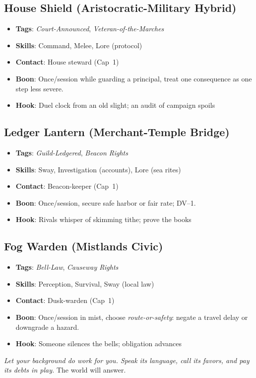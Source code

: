 \subsection*{House Shield (Aristocratic-Military Hybrid)}
\begin{itemize}
\item \textbf{Tags}: \textit{Court-Announced}, \textit{Veteran-of-the-Marches}
\item \textbf{Skills}: Command, Melee, Lore (protocol)
\item \textbf{Contact}: House steward (Cap~1)
\item \textbf{Boon}: Once/session while guarding a principal, treat one consequence as one step less severe.
\item \textbf{Hook}: Duel clock from an old slight; an audit of campaign spoils
\end{itemize}

\subsection*{Ledger Lantern (Merchant-Temple Bridge)}
\begin{itemize}
\item \textbf{Tags}: \textit{Guild-Ledgered}, \textit{Beacon Rights}
\item \textbf{Skills}: Sway, Investigation (accounts), Lore (sea rites)
\item \textbf{Contact}: Beacon-keeper (Cap~1)
\item \textbf{Boon}: Once/session, secure safe harbor or fair rate; DV--1.
\item \textbf{Hook}: Rivals whisper of skimming tithe; prove the books
\end{itemize}

\subsection*{Fog Warden (Mistlands Civic) }
\begin{itemize}
\item \textbf{Tags}: \textit{Bell-Law}, \textit{Causeway Rights}
\item \textbf{Skills}: Perception, Survival, Sway (local law)
\item \textbf{Contact}: Dusk-warden (Cap~1)
\item \textbf{Boon}: Once/session in mist, choose \emph{route-or-safety}: negate a travel delay or downgrade a hazard.
\item \textbf{Hook}: Someone silences the bells; obligation advances
\end{itemize}

\bigskip
\noindent\emph{Let your background do work for you. Speak its language, call its favors, and pay its debts in play.} The world will answer.